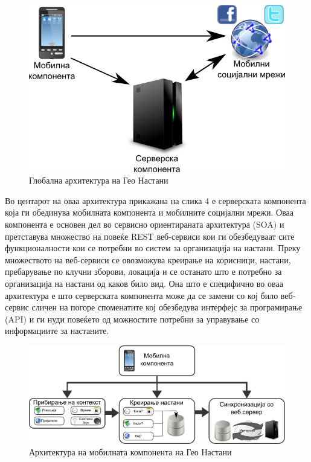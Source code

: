 \begin{figure}[htb]
\centering
\includegraphics[scale=0.4]{images/architecture}
\caption{Глобална архитектура на Гео Настани}
\label{fig:architecture}
\end{figure}

 
Во центарот на оваа архитектура прикажана на слика 4 е серверската компонента
која ги обединува мобилната компонента и мобилните социјални мрежи. Оваа
компонента е основен дел во сервисно ориентираната архитектура (SOA) и
претставува множество на повеќе REST веб-сервиси кои ги обезбедуваат сите
функционалности кои се потребни во систем за организација на настани. Преку
множеството на веб-сервиси се овозможува креирање на корисници, настани,
пребарување по клучни зборови, локација и се останато што е потребно за
организација на настани од каков било вид. Она што е специфично во оваа
архитектура е што серверската компонента може да се замени со кој било
веб-сервис сличен на погоре споменатите кој обезбедува интерфејс за програмирање
(API) и ги нуди повеќето од можностите потребни за управување со информациите за
настаните.

\begin{figure}[htb]
\centering
\includegraphics[scale=0.4]{images/mobile_component}
\caption{Архитектура на мобилната компонента на Гео Настани}
\label{fig:mobile_component}
\end{figure}
 
